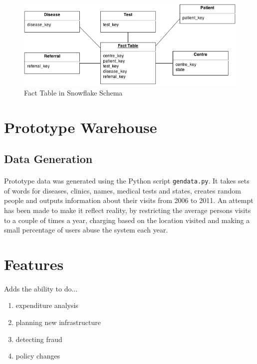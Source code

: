 \documentclass[a4paper,12pt,openbib]{article}
\begin{document}
\begin{figure}[ht!]
	\centering
	\includegraphics[width=15cm]{schema}
	\caption{Fact Table in Snowflake Schema}
	\label{fig:schema}
\end{figure}

\section*{Prototype Warehouse}
\subsection*{Data Generation}
\paragraph{}
	Prototype data was generated using the Python script \texttt{gendata.py}.
	It takes sets of words for diseases, clinics, names, medical tests and states, creates random people and outputs information about their visits from 2006 to 2011.
	An attempt has been made to make it reflect reality, by restricting the average persons visits to a couple of times a year, charging based on the location visited and making a small percentage of users abuse the system each year.

\section*{Features}
\paragraph{}
Adds the ability to do...
\begin{enumerate}
	\item expenditure analysis
	\item planning new infrastructure
	\item detecting fraud
	\item policy changes
\end{enumerate}
\end{document}
